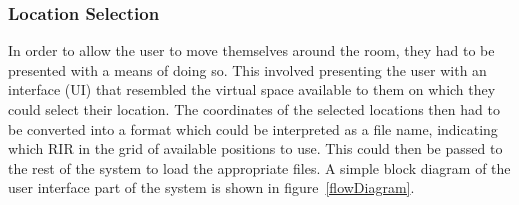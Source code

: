 \documentclass[../../main.tex]{subfiles}
\begin{document}
		\subsubsection{Location Selection}
		\label{locationSelection}

			In order to allow the user to move themselves around the room, they had to be presented with a means of doing so. This involved presenting the user with an interface (UI) that resembled the virtual space available to them on which they could select their location. The coordinates of the selected locations then had to be converted into a format which could be interpreted as a file name, indicating which \ac{RIR} in the grid of available positions to use. This could then be passed to the rest of the system to load the appropriate files. A simple block diagram of the user interface part of the system is shown in figure~\ref{flowDiagram}.
\end{document}
